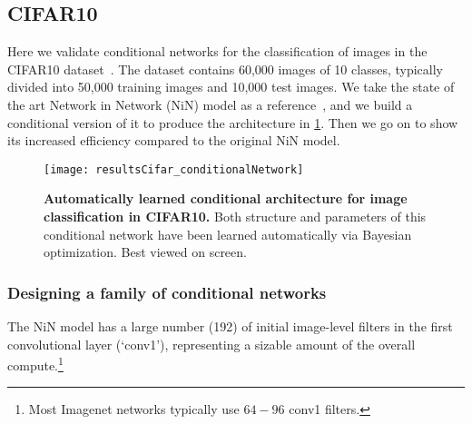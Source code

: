 \documentclass[thesis]{subfiles}
\begin{document}
	
	\subsection{CIFAR10}
	Here we validate conditional networks for the classification of images in the CIFAR10 dataset~\citep{CIFAR10}. 
	The dataset contains 60,000 images of 10 classes, typically divided into 50,000 training images and 10,000 test images. 
	We take the state of the art Network in Network (NiN) model 
	as a reference~\citep{Lin2013NiN}, and we build a conditional version of it to produce the architecture in \cref{fig:Cifar_CondNet}. 
	Then we go on to show its increased efficiency compared to the original NiN model.
	
	\begin{figure}[tbp]
		\centerline{
			\texttt{[image: resultsCifar\_conditionalNetwork]}
		}
		\caption[Automatically learned conditional architecture for CIFAR10.]{\textbf{Automatically learned conditional architecture for image classification in CIFAR10.} Both structure and parameters of this conditional network have been learned automatically via Bayesian optimization. Best viewed on screen.}
		\label{fig:Cifar_CondNet}
	\end{figure}
	
	\subsubsection{Designing a family of conditional networks}
	The NiN model has a large number (192) of initial image-level filters in the first convolutional layer (`conv1'), 
	representing a sizable amount of the overall compute.\footnote{Most Imagenet networks typically use $64-96$ conv1 filters.}
	
\end{document}
